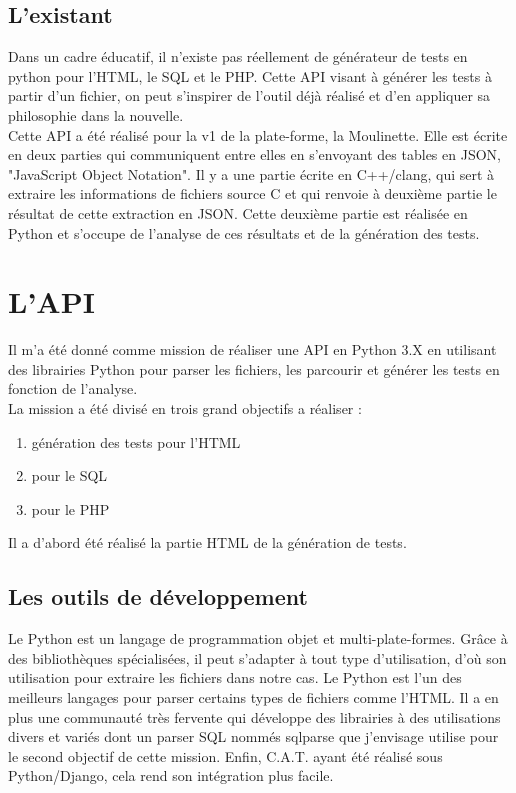 \subsection{L'existant}

Dans un cadre éducatif, il n'existe pas réellement de générateur de tests en python pour l'HTML, le SQL et le PHP. Cette API visant à générer les tests à partir d'un fichier, on peut s'inspirer de l'outil déjà réalisé et d'en appliquer sa philosophie dans la nouvelle.\\

Cette API a été réalisé pour la v1 de la plate-forme, la Moulinette. Elle est écrite en deux parties qui communiquent entre elles en s'envoyant des tables en JSON, "JavaScript Object Notation". Il y a une partie écrite en C++/clang, qui sert à extraire les informations de fichiers source C et qui renvoie à deuxième partie le résultat de cette extraction en JSON. Cette deuxième partie est réalisée en Python et s'occupe de l'analyse de ces résultats et de la génération des tests.\\

\section{L'API}

Il m'a été donné comme mission de réaliser une API en Python 3.X en utilisant des librairies Python pour parser les fichiers, les parcourir et générer les tests en fonction de l'analyse.\\

La mission a été divisé en trois grand objectifs a réaliser :\\

\begin{enumerate}
\item génération des tests pour l'HTML
\item pour le SQL
\item pour le PHP
\end{enumerate}

Il a d'abord été réalisé la partie HTML de la génération de tests.\\

\subsection{Les outils de développement}

Le Python est un langage de programmation objet et multi-plate-formes. Grâce à des bibliothèques spécialisées, il peut s'adapter à tout type d'utilisation, d'où son utilisation pour extraire les fichiers dans notre cas. Le Python est l'un des meilleurs langages pour parser certains types de fichiers comme l'HTML. Il a en plus une communauté très fervente qui développe des librairies à des utilisations divers et variés dont un parser SQL nommés sqlparse que j'envisage utilise pour le second objectif de cette mission. Enfin, C.A.T. ayant été réalisé sous Python/Django, cela rend son intégration plus facile.\\

